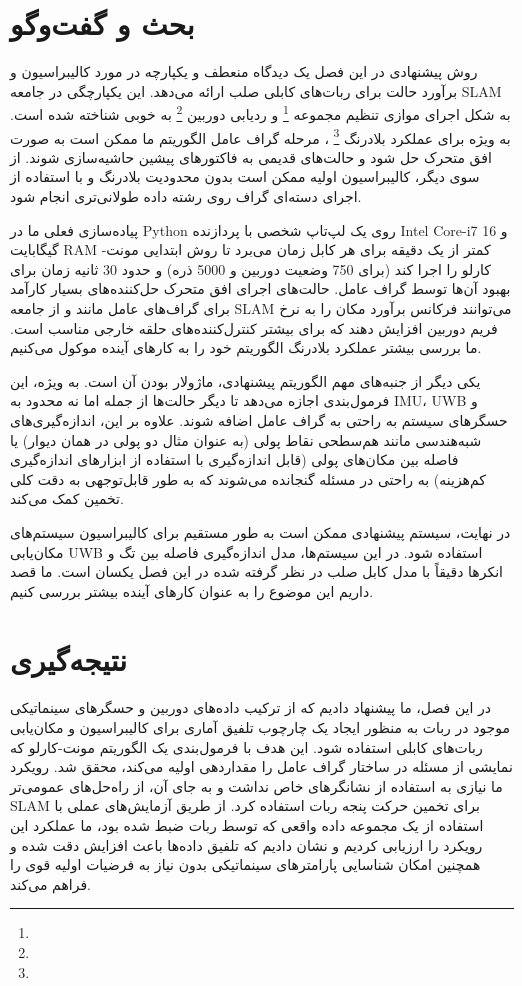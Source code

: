 \section{بحث و گفت‌وگو}
روش پیشنهادی در این فصل یک دیدگاه منعطف و یکپارچه در مورد کالیبراسیون و برآورد حالت برای ربات‌های کابلی صلب ارائه می‌دهد. این یکپارچگی در جامعه SLAM به شکل اجرای موازی تنظیم مجموعه
\footnote{}
 و ردیابی دوربین 
\footnote{}
 به خوبی شناخته شده است. به ویژه برای عملکرد بلادرنگ
\footnote{}
 ، مرحله گراف عامل الگوریتم ما ممکن است به صورت افق متحرک حل شود و حالت‌های قدیمی به فاکتورهای پیشین حاشیه‌سازی شوند. از سوی دیگر، کالیبراسیون اولیه ممکن است بدون محدودیت بلادرنگ و با استفاده از اجرای دسته‌ای گراف روی رشته داده طولانی‌تری انجام شود.

پیاده‌سازی فعلی ما در Python روی یک لپ‌تاپ شخصی با پردازنده Intel Core-i7 و 16 گیگابایت RAM کمتر از یک دقیقه برای هر کابل زمان می‌برد تا روش ابتدایی مونت-کارلو را اجرا کند (برای 750 وضعیت دوربین و 5000 ذره) و حدود 30 ثانیه زمان برای بهبود آن‌ها توسط گراف عامل. حالت‌های اجرای افق متحرک حل‌کننده‌های بسیار کارآمد برای گراف‌های عامل مانند 
\cite{dellaert2012factor} و \cite{martiros2022symforce}
 از جامعه SLAM می‌توانند فرکانس برآورد مکان را به نرخ فریم دوربین افزایش دهند که برای بیشتر کنترل‌کننده‌های حلقه خارجی مناسب است. ما بررسی بیشتر عملکرد بلادرنگ الگوریتم خود را به کارهای آینده موکول می‌کنیم.

یکی دیگر از جنبه‌های مهم الگوریتم پیشنهادی، ماژولار بودن آن است. به ویژه، این فرمول‌بندی اجازه می‌دهد تا دیگر حالت‌ها از جمله اما نه محدود به IMU، UWB و حسگرهای سیستم به راحتی به گراف عامل اضافه شوند. علاوه بر این، اندازه‌گیری‌های شبه‌هندسی مانند هم‌سطحی نقاط پولی (به عنوان مثال دو پولی در همان دیوار) یا فاصله بین مکان‌های پولی (قابل اندازه‌گیری با استفاده از ابزارهای اندازه‌گیری کم‌هزینه) به راحتی در مسئله گنجانده می‌شوند که به طور قابل‌توجهی به دقت کلی تخمین کمک می‌کند.

در نهایت، سیستم پیشنهادی ممکن است به طور مستقیم برای کالیبراسیون سیستم‌های مکان‌یابی UWB استفاده شود. در این سیستم‌ها، مدل اندازه‌گیری فاصله بین تگ و انکرها دقیقاً با مدل کابل صلب در نظر گرفته شده در این فصل یکسان است. ما قصد داریم این موضوع را به عنوان کارهای آینده بیشتر بررسی کنیم.


\section{نتیجه‌گیری}

در این فصل، ما پیشنهاد دادیم که از ترکیب داده‌های دوربین و حسگرهای سینماتیکی موجود در ربات به منظور ایجاد یک چارچوب تلفیق آماری برای کالیبراسیون و مکان‌یابی ربات‌های کابلی استفاده شود. این هدف با فرمول‌بندی یک الگوریتم مونت-کارلو که نمایشی از مسئله در ساختار گراف عامل را مقداردهی اولیه می‌کند، محقق شد. رویکرد ما نیازی به استفاده از نشانگرهای خاص نداشت و به جای آن، از راه‌حل‌های عمومی‌تر SLAM برای تخمین حرکت پنجه ربات استفاده کرد. از طریق آزمایش‌های عملی با استفاده از یک مجموعه داده واقعی که توسط ربات  ضبط شده بود، ما عملکرد این رویکرد را ارزیابی کردیم و نشان دادیم که تلفیق داده‌ها باعث افزایش دقت شده و همچنین امکان شناسایی پارامترهای سینماتیکی بدون نیاز به فرضیات اولیه قوی را فراهم می‌کند. 
